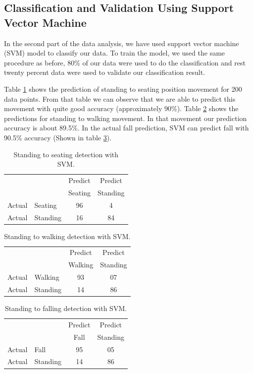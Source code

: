 \documentclass{llncs}
\begin{document}
\begin{sloppy}
\subsection*{Classification and Validation Using Support Vector Machine}

In the second part of the data analysis, we have used support vector machine (SVM) model
to classify our data. To train the model, we used the same procedure as before, 80\% of
our data were used to do the classification and rest twenty percent data were used to validate our
classification result.

Table \ref{tab:StandingToSeatingDetectionsvm} shows the prediction of standing to seating position
movement for 200 data points. From that table we can observe that we are able to predict this
movement with quite good accuracy (approximately 90\%). Table
\ref{tab:StandingToWalkingDetectionsvm} shows the predictions for standing to
walking movement. In that movement our prediction accuracy is about 89.5\%. In the actual fall
prediction, SVM can predict fall with 90.5\% accuracy (Shown in table
\ref{tab:StandingToFallingDetectionsvm}).
\vspace{-5mm}
\begin{table}[!h]
\caption{Standing to seating detection with SVM.}
	\label{tab:StandingToSeatingDetectionsvm}
	\centering
		\begin{tabular} {l l |c |c}
			& & Predict& Predict \\ 
			& & Seating & Standing \\ \hline
			Actual& Seating & 96 & 4\\ \hline
			Actual& Standing & 16& 84\\ \hline
		\end{tabular}
\end{table}
\vspace{-10mm}
\begin{table}[!h]
	\caption{Standing to walking detection with SVM.}
	\label{tab:StandingToWalkingDetectionsvm}
	\centering
		\begin{tabular} {l l |c |c}
			& & Predict& Predict \\ 
			& & Walking & Standing \\ \hline
			Actual& Walking & 93 & 07\\ \hline
			Actual& Standing & 14& 86\\ \hline
		\end{tabular}
\end{table}
\vspace{-10mm}
\begin{table}[!h]
	\caption{Standing to falling detection with SVM.}
	\label{tab:StandingToFallingDetectionsvm}
	\centering
		\begin{tabular} {l l |c |c}
			& & Predict& Predict \\ 
			& & Fall & Standing \\ \hline
			Actual& Fall & 95 & 05\\ \hline
			Actual& Standing & 14& 86\\ \hline
		\end{tabular}
\end{table}
\vspace{-5mm}

\end{sloppy}
\end{document}

